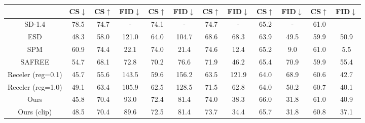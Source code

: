 \begin{table}[h!]
\begin{minipage}{0.68\textwidth}
{\begin{tabular}{c|c|cc|cc|cc|cc|cc}
        \midrule
        & CS$\downarrow$ &  CS$\uparrow$ & FID$\downarrow$ & CS$\uparrow$ & FID$\downarrow$ & CS$\uparrow$ & FID$\downarrow$ & CS$\uparrow$ & FID$\downarrow$ & CS$\uparrow$ & FID$\downarrow$ \\
        \midrule
        SD-1.4 & 78.5 & 74.7 & - & 74.1 & - & 74.7 & - & 65.2 & - & 61.0 \\
        \midrule
        ESD  & 48.3 & 58.0 & 121.0 & 64.0 & 104.7 & 68.6 & 68.3 & 63.9 & 49.5 & 59.9 & 50.9 \\
        SPM  & 60.9  & 74.4 & 22.1 & 74.0 & 21.4 & 74.6 & 12.4 & 65.2 & 9.0 & 61.0 & 5.5 \\
        SAFREE  & 54.7  & 68.1 & 72.8 & 70.2 & 76.6 & 71.9 & 46.2 & 65.4 & 70.9 & 59.9 & 55.4 \\ 
        Receler (reg=0.1)  & 45.7 & 55.6 & 143.5 & 59.6 & 156.2 & 63.5 & 121.9 & 64.0 & 68.9 & 60.6 & 42.7 \\ 
        Receler (reg=1.0) &  49.1 & 63.4 & 105.9 & 62.5 & 128.5 & 71.5 & 62.8 & 64.0 & 50.2  & 60.7 & 40.1 \\ \midrule
        Ours  & 45.8  & 70.4 & 93.0 & 72.4 & 81.4 & 74.0 & 38.3 & 66.0 & 31.8 & 61.0 & 40.9 \\
        Ours (clip)  & 48.5  & 70.4 & 89.6 & 72.5 & 81.4 & 73.7 & 34.4 & 65.7 & 31.8 & 60.8 & 37.1 \\
        \bottomrule
    \end{tabular}
    }
\end{minipage}
\end{table}
\fi

